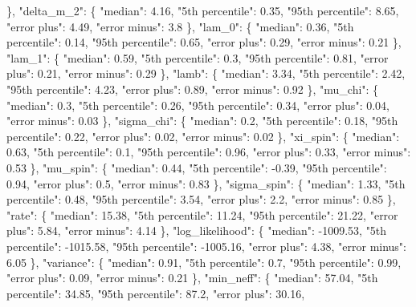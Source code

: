 {{        \}, %
        "delta\_m\_2": \{%
          "median": 4.16, %
          "5th percentile": 0.35, %
          "95th percentile": 8.65, %
          "error plus": 4.49, %
          "error minus": 3.8%
        \}, %
        "lam\_0": \{%
          "median": 0.36, %
          "5th percentile": 0.14, %
          "95th percentile": 0.65, %
          "error plus": 0.29, %
          "error minus": 0.21%
        \}, %
        "lam\_1": \{%
          "median": 0.59, %
          "5th percentile": 0.3, %
          "95th percentile": 0.81, %
          "error plus": 0.21, %
          "error minus": 0.29%
        \}, %
        "lamb": \{%
          "median": 3.34, %
          "5th percentile": 2.42, %
          "95th percentile": 4.23, %
          "error plus": 0.89, %
          "error minus": 0.92%
        \}, %
        "mu\_chi": \{%
          "median": 0.3, %
          "5th percentile": 0.26, %
          "95th percentile": 0.34, %
          "error plus": 0.04, %
          "error minus": 0.03%
        \}, %
        "sigma\_chi": \{%
          "median": 0.2, %
          "5th percentile": 0.18, %
          "95th percentile": 0.22, %
          "error plus": 0.02, %
          "error minus": 0.02%
        \}, %
        "xi\_spin": \{%
          "median": 0.63, %
          "5th percentile": 0.1, %
          "95th percentile": 0.96, %
          "error plus": 0.33, %
          "error minus": 0.53%
        \}, %
        "mu\_spin": \{%
          "median": 0.44, %
          "5th percentile": {-}0.39, %
          "95th percentile": 0.94, %
          "error plus": 0.5, %
          "error minus": 0.83%
        \}, %
        "sigma\_spin": \{%
          "median": 1.33, %
          "5th percentile": 0.48, %
          "95th percentile": 3.54, %
          "error plus": 2.2, %
          "error minus": 0.85%
        \}, %
        "rate": \{%
          "median": 15.38, %
          "5th percentile": 11.24, %
          "95th percentile": 21.22, %
          "error plus": 5.84, %
          "error minus": 4.14%
        \}, %
        "log\_likelihood": \{%
          "median": {-}1009.53, %
          "5th percentile": {-}1015.58, %
          "95th percentile": {-}1005.16, %
          "error plus": 4.38, %
          "error minus": 6.05%
        \}, %
        "variance": \{%
          "median": 0.91, %
          "5th percentile": 0.7, %
          "95th percentile": 0.99, %
          "error plus": 0.09, %
          "error minus": 0.21%
        \}, %
        "min\_neff": \{%
          "median": 57.04, %
          "5th percentile": 34.85, %
          "95th percentile": 87.2, %
          "error plus": 30.16, %
}}
